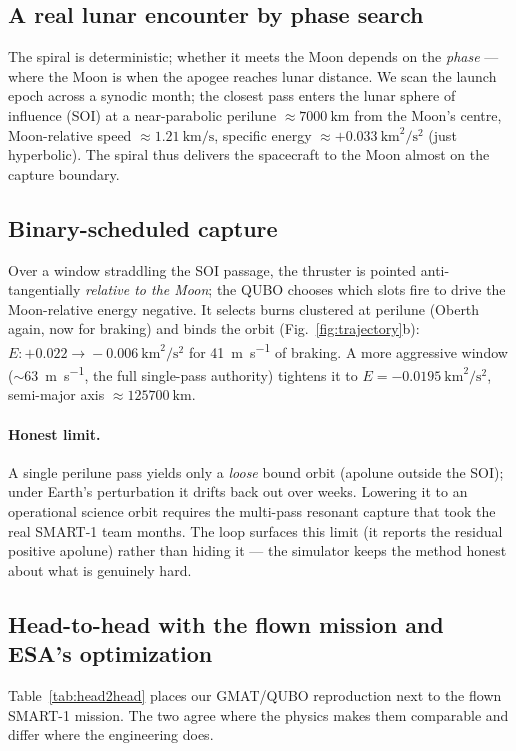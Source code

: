 \documentclass[11pt,a4paper]{article}
\theoremstyle{plain}
\begin{document}
\subsection{A real lunar encounter by phase search}
The spiral is deterministic; whether it meets the Moon depends on the
\emph{phase} --- where the Moon is when the apogee reaches lunar distance. We
scan the launch epoch across a synodic month; the closest pass enters the
lunar sphere of influence (SOI) at a near-parabolic perilune
$\approx\SI{7000}{\km}$ from the Moon's centre, Moon-relative speed
$\approx\SI{1.21}{\km\per\second}$, specific energy
$\approx+\SI{0.033}{\km\squared\per\second\squared}$ (just hyperbolic). The
spiral thus delivers the spacecraft to the Moon almost on the capture
boundary.

\subsection{Binary-scheduled capture}
Over a window straddling the SOI passage, the thruster is pointed
anti-tangentially \emph{relative to the Moon}; the QUBO chooses which slots
fire to drive the Moon-relative energy negative. It selects burns clustered at
perilune (Oberth again, now for braking) and binds the orbit
(Fig.~\ref{fig:trajectory}b):
$E\colon +0.022\!\to\!-0.006\ \si{\km\squared\per\second\squared}$ for
\SI{41}{\meter\per\second} of braking. A more aggressive window
($\sim$\SI{63}{\meter\per\second}, the full single-pass authority) tightens it
to $E=-\SI{0.0195}{\km\squared\per\second\squared}$, semi-major axis
$\approx\SI{125700}{\km}$.

\paragraph{Honest limit.} A single perilune pass yields only a \emph{loose}
bound orbit (apolune outside the SOI); under Earth's perturbation it drifts
back out over weeks. Lowering it to an operational science orbit requires the
multi-pass resonant capture that took the real SMART-1 team months. The loop
surfaces this limit (it reports the residual positive apolune) rather than
hiding it --- the simulator keeps the method honest about what is genuinely
hard.

\subsection{Head-to-head with the flown mission and ESA's optimization}
\label{sec:head2head}
Table~\ref{tab:head2head} places our GMAT/QUBO reproduction next to the flown
SMART-1 mission. The two agree where the physics makes them comparable and
differ where the engineering does.
\end{document}
